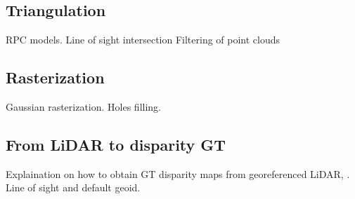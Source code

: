 \subsection{Triangulation}
RPC models. Line of sight intersection
Filtering of point clouds

\subsection{Rasterization}
Gaussian rasterization. Holes filling.  

\subsection{From LiDAR to disparity GT}
Explaination on how to obtain GT disparity maps from georeferenced LiDAR, \cite{cournet_ground_2020}. Line of sight and default geoid. 

\pagebreak